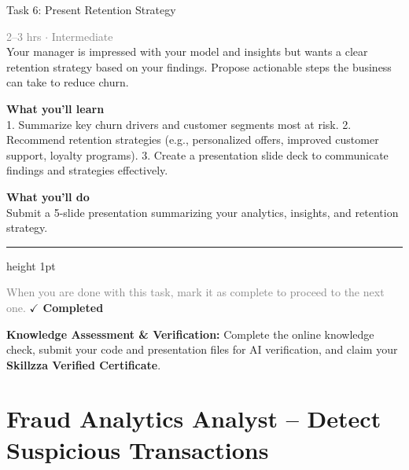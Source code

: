 \documentclass[10pt,a4paper]{article}
\begin{document}
\begin{taskbox}{Task 6: Present Retention Strategy}

    {\small \textcolor{gray}{2--3 hrs $\cdot$ Intermediate}}\\[12pt]

      
Your manager is impressed with your model and insights but wants a clear retention strategy based on your findings. Propose actionable steps the business can take to reduce churn.


\vspace{8pt}
{\large \textbf{\textcolor{brandLight}{What you'll learn}}}\\[4pt]  
1. Summarize key churn drivers and customer segments most at risk.  
2. Recommend retention strategies (e.g., personalized offers, improved customer support, loyalty programs).  
3. Create a presentation slide deck to communicate findings and strategies effectively.  

\vspace{8pt}
{\large \textbf{\textcolor{brandLight}{What you'll do}}}\\[4pt]  
Submit a 5-slide presentation summarizing your analytics, insights, and retention strategy.\par

    \vspace{16pt}

    \textcolor{cardBorder}{\hrule height 1pt}\vspace{8pt}

    \small \textcolor{gray}{When you are done with this task, mark it as complete to proceed to the next one.} \hfill \textbf{\textcolor{brandDark}{$\checkmark$ Completed}}

\end{taskbox}

\begin{completionbox}
    \textbf{Knowledge Assessment \& Verification:} Complete the online knowledge check, submit your code and presentation files for AI verification, and claim your \textbf{Skillzza Verified Certificate}.
\end{completionbox}

\newpage




\section*{Fraud Analytics Analyst – Detect Suspicious Transactions}
\end{document}

